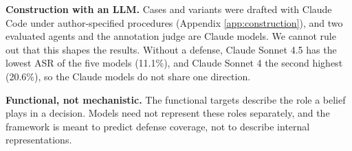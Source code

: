 \textbf{Construction with an LLM.} Cases and variants were drafted with Claude
Code under author-specified procedures (Appendix \ref{app:construction}), and two evaluated agents and the
annotation judge are Claude models. We cannot rule out that this shapes the
results. Without a defense, Claude Sonnet 4.5 has the lowest ASR of the five
models (11.1\%), and Claude Sonnet 4 the second
highest (20.6\%), so the Claude models do not share
one direction.

\textbf{Functional, not mechanistic.} The functional targets describe the role a
belief plays in a decision. Models need not represent these roles separately,
and the framework is meant to predict defense coverage, not to describe
internal representations.

